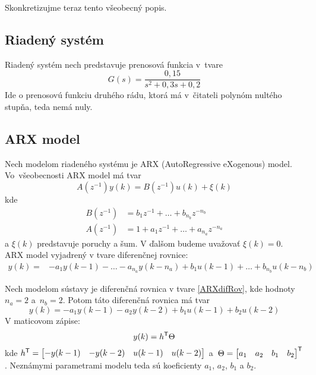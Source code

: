 \documentclass[a4paper, 10pt, ]{article}
\begin{document}
Skonkretizujme teraz tento všeobecný popis.





\subsection{Riadený systém}

Riadený systém nech predstavuje prenosová funkcia v~tvare
\begin{equation} \label{riadenySys}
	G(s) = \frac{0,15}{s^2 + 0,3s + 0,2}
\end{equation}
Ide o prenosovú funkciu druhého rádu, ktorá má v~čitateli polynóm nultého stupňa, teda nemá nuly.




\subsection{ARX model}

Nech modelom riadeného systému je ARX (AutoRegressive eXogenous) model. Vo~všeobecnosti ARX model má tvar
\begin{equation} \label{ARX}
	A(z^{-1})y(k) = B(z^{-1})u(k) + \xi(k)
\end{equation}
kde
\begin{equation}
	\begin{split}
		 B(z^{-1}) &= b_1z^{-1} + \ldots + b_{n_b}z^{-n_b} \\
		 A(z^{-1}) &= 1 + a_1z^{-1} + \ldots + a_{n_a}z^{-n_a}
	\end{split}
\end{equation}
a $\xi(k)$ predstavuje poruchy a šum. V ďalšom budeme uvažovať $\xi(k) = 0$. ARX model vyjadrený v tvare diferenčnej rovnice:
\begin{equation} \label{ARXdifRov}
	\begin{split}
		y(k) = & -a_1y(k-1) - \ldots - a_{n_a}y(k-n_a) +  b_1u(k-1) + \ldots + b_{n_b}u(k-n_b)
	\end{split}
\end{equation}

Nech modelom sústavy je diferenčná rovnica v tvare \eqref{ARXdifRov}, kde hodnoty $n_a = 2$ a~$n_b = 2$. Potom táto diferenčná rovnica má tvar
\begin{equation} \label{modelDifRov}
	y(k) =  - a_1y(k-1) - a_2y(k-2) + b_1u(k-1) + b_2u(k-2)
\end{equation}
V maticovom zápise:
\begin{equation} \label{modelMatic}
	y(k) = h^{\mathsf{T}} \Theta
\end{equation}
kde $h^{\mathsf{T}} = \begin{bmatrix} -y(k-1) & -y(k-2) & u(k-1) & u(k-2) \end{bmatrix}$  a~$\Theta = \begin{bmatrix} a_1 & a_2 & b_1 & b_2 \end{bmatrix}^{\mathsf{T}}$.
Neznámymi parametrami modelu teda sú koeficienty $a_1$, $a_2$, $b_1$ a $b_2$.
\end{document}
